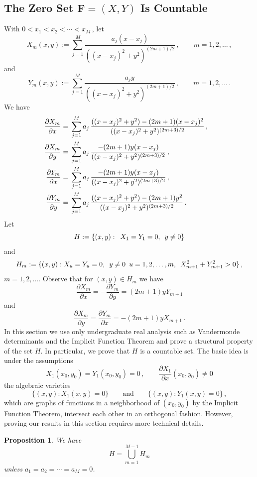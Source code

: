 \documentclass{article}
\newtheorem{prop}[thm]{Proposition}
\theoremstyle{remark}
\numberwithin{equation}{section}
\begin{document}
\subsection{The Zero Set ${\mathbf F}=(X,Y)$ Is Countable}\label{2Curves}\label{subsec3.3}

With $0 < x_1 < x_2 < \cdots < x_M\,$, let
$$X_m(x,y) := \sum_{j=1}^M{\frac{a_j(x-x_j)}{((x-x_j)^2 + y^2)^{(2m+1)/2}}}\,, \qquad m=1,2, \ldots\,,$$
and
$$Y_m(x,y) := \sum_{j=1}^M{\frac{a_jy}{((x-x_j)^2 + y^2)^{(2m+1)/2}}}\,, \qquad m=1,2, \ldots\,.$$
We have
\begin{equation} \notag \begin{split}
\frac{\partial{X_m}}{\partial x} & = \, \sum_{j=1}^M{a_j \, \frac{((x-x_j)^2 + y^2)-(2m+1)(x-x_j)^2}{((x-x_j)^2 + y^2)^{(2m+3)/2}}}\,, \cr
\frac{\partial{X_m}}{\partial y} & = \, \sum_{j=1}^M{a_j \, \frac{-(2m+1)y(x-x_j)}{((x-x_j)^2 + y^2)^{(2m+3)/2}}}\,, \cr
\frac{\partial{Y_m}}{\partial x} & = \, \sum_{j=1}^M{a_j \, \frac{-(2m+1)y(x-x_j)}{((x-x_j)^2 + y^2)^{(2m+3)/2}}}\,, \cr
\frac{\partial{Y_m}}{\partial y} & = \, \sum_{j=1}^M{a_j \, \frac{((x-x_j)^2 + y^2)-(2m+1)y^2}{((x-x_j)^2 + y^2)^{(2m+3)/2}}}\,. \cr
\end{split} \end{equation}
Let
$$H := \{(x,y): \enskip X_1=Y_1=0, \enskip y \neq 0\}$$
and
$$H_m := \{(x,y): X_u = Y_u = 0, \enskip y \neq 0 \enskip u=1,2,\ldots,m, \enskip X_{m+1}^2 + Y_{m+1}^2 > 0\}\,,$$
$m=1,2,\ldots$. Observe that for $(x,y) \in H_m$ we have
$$\frac{\partial{X_m}}{\partial x} = -\frac{\partial{Y_m}}{\partial y} = (2m+1)yY_{m+1}$$
and
$$\frac{\partial{X_m}}{\partial y} = \frac{\partial{Y_m}}{\partial x} =-(2m+1)yX_{m+1}\,.$$
In this section we use only undergraduate real analysis such as Vandermonde determinants and the Implicit Function Theorem and
prove a structural property of the set $H$. In particular, we prove that $H$ is a countable set. The basic idea is under the assumptions
$$X_1(x_0,y_0) = Y_1(x_0,y_0)=0\,, \qquad \frac{\partial X_1}{\partial x}(x_0,y_0) \neq 0$$
the algebraic varieties
$$\{(x,y):X_1(x,y) = 0\} \qquad \text{and} \qquad \{(x,y):Y_1(x,y)=0\}\,,$$
which are graphs of functions in a neighborhood of $(x_0,y_0)$ by the Implicit Function Theorem, intersect
each other in an orthogonal fashion. However, proving our results in this section requires more technical
details.

\begin{prop}\label{union}
We have
$$H = \bigcup_{m=1}^{M-1}{H_m}$$
unless $a_1=a_2= \cdots =a_M = 0$.
\end{prop}
\end{document}
